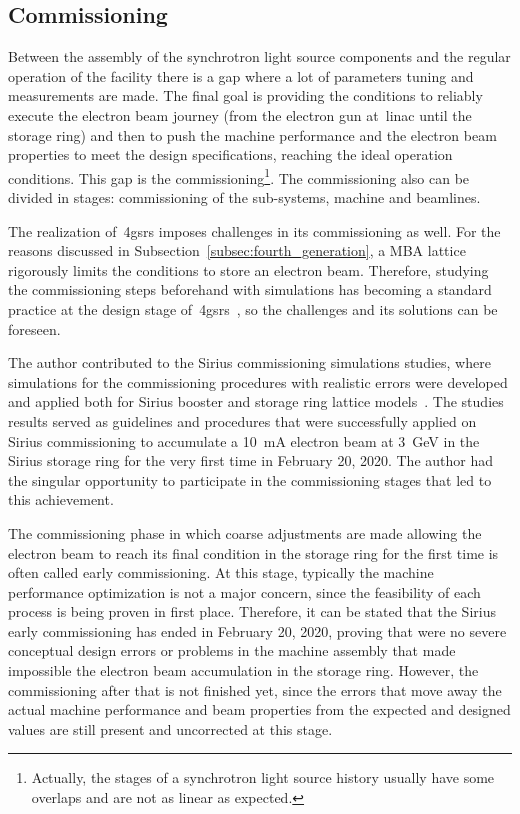 \subsection{Commissioning}
Between the assembly of the synchrotron light source components and the regular operation of the facility there is a gap where a lot of parameters tuning and measurements are made. The final goal is providing the conditions to reliably execute the electron beam journey (from the electron gun at~\gls{linac} until the storage ring) and then to push the machine performance and the electron beam properties to meet the design specifications, reaching the ideal operation conditions. This gap is the commissioning\footnote{Actually, the stages of a synchrotron light source history usually have some overlaps and are not as linear as expected.}. The commissioning also can be divided in stages: commissioning of the sub-systems, machine and beamlines.

The realization of~\glspl{4gsr} imposes challenges in its commissioning as well. For the reasons discussed in Subsection~\ref{subsec:fourth_generation}, a MBA lattice rigorously limits the conditions to store an electron beam. Therefore, studying the commissioning steps beforehand with simulations has becoming a standard practice at the design stage of~\glspl{4gsr}~\cite{sajaev2015, liuzzo2017, ghasem2019, sajaev2019, hellert2019}, so the challenges and its solutions can be foreseen. 

The author contributed to the Sirius commissioning simulations studies, where simulations for the commissioning procedures with realistic errors were developed and applied both for Sirius booster and storage ring lattice models~\cite{alves2019}. The studies results served as guidelines and procedures that were successfully applied on Sirius commissioning to accumulate a \SI{10}{\milli\ampere} electron beam at \SI{3}{\giga\electronvolt} in the Sirius storage ring for the very first time in February 20, 2020. The author had the singular opportunity to participate in the commissioning stages that led to this achievement.

The commissioning phase in which coarse adjustments are made allowing the electron beam to reach its final condition in the storage ring for the first time is often called early commissioning. At this stage, typically the machine performance optimization is not a major concern, since the feasibility of each process is being proven in first place. Therefore, it can be stated that the Sirius early commissioning has ended in February 20, 2020, proving that were no severe conceptual design errors or problems in the machine assembly that made impossible the electron beam accumulation in the storage ring. However, the commissioning after that is not finished yet, since the errors that move away the actual machine performance and beam properties from the expected and designed values are still present and uncorrected at this stage.

